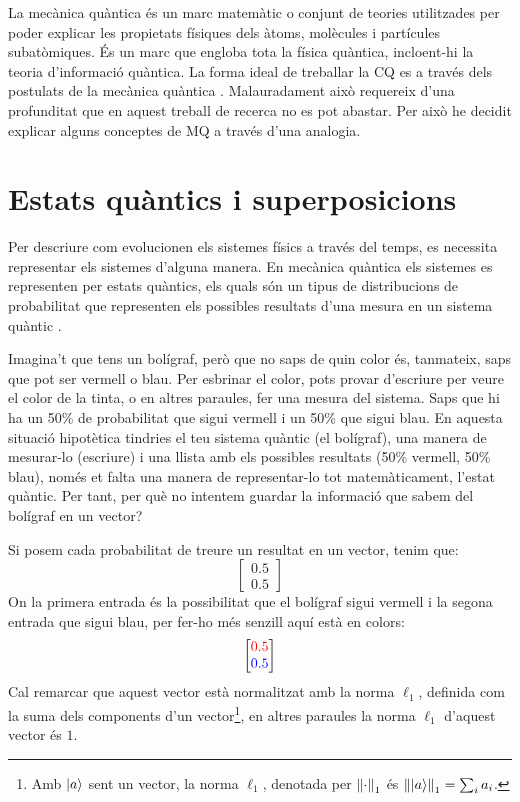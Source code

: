 La mecànica quàntica és un marc matemàtic o conjunt de teories utilitzades per poder explicar les propietats físiques dels àtoms, molècules i partícules subatòmiques. És un marc que engloba tota la física quàntica, incloent-hi la teoria d'informació quàntica. La forma ideal de treballar la CQ es a través dels postulats de la mecànica quàntica \cite{QCandQI:QM_postulates}. Malauradament això requereix d'una profunditat que en aquest treball de recerca no es pot abastar. Per això he decidit explicar alguns conceptes de MQ a través d'una analogia.

\section{Estats quàntics i superposicions}
Per descriure com evolucionen els sistemes físics a través del temps, es necessita representar els sistemes d'alguna manera. En mecànica quàntica els sistemes es representen per estats quàntics, els quals són un tipus de distribucions de probabilitat que representen els possibles resultats d'una mesura en un sistema quàntic \cite{QT_concepts:q_systems}.

Imagina't que tens un bolígraf, però que no saps de quin color és, tanmateix, saps que pot ser vermell o blau. Per esbrinar el color, pots provar d'escriure per veure el color de la tinta, o en altres paraules, fer una mesura del sistema. Saps que hi ha un 50\% de probabilitat que sigui vermell i un 50\% que sigui blau. En aquesta situació hipotètica tindries el teu sistema quàntic (el bolígraf), una manera de mesurar-lo (escriure) i una llista amb els possibles resultats (50\% vermell, 50\% blau), només et falta una manera de representar-lo tot matemàticament, l'estat quàntic. Per tant, per què no intentem guardar la informació que sabem del bolígraf en un vector?

Si posem cada probabilitat de treure un resultat en un vector, tenim que:
$$
\begin{bmatrix}
	0.5 \\
	0.5
\end{bmatrix}
$$
On la primera entrada és la possibilitat que el bolígraf sigui vermell i la segona entrada que sigui blau, per fer-ho més senzill aquí està en colors:
$$
\begin{bmatrix}
	\textcolor{red}{0.5} \\
	\textcolor{blue}{0.5}
\end{bmatrix}
$$
Cal remarcar que aquest vector està normalitzat amb la norma $\ell_1$, definida com la suma dels components d'un vector\footnote{Amb $\ket{a}$ sent un vector, la norma $\ell_1$, denotada per $\norm{\cdot}_1$ és $\norm{\ket{a}}_1 = \sum_i a_i$.}, en altres paraules la norma $\ell_1$ d'aquest vector és $1$.


